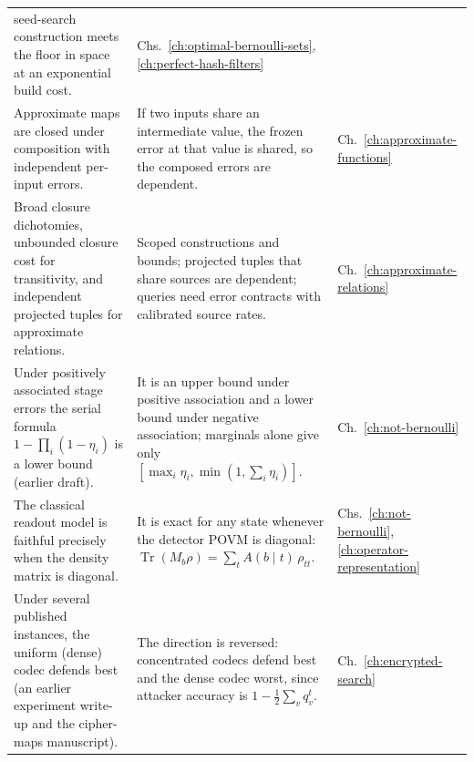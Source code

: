 \begin{longtable}{@{}>{\raggedright\arraybackslash}p{}
                   >{\raggedright\arraybackslash}p{}
                   >{\raggedright\arraybackslash}p{}@{}}
    seed-search construction meets the floor in space at an exponential build
    cost.
  & Chs.~\ref{ch:optimal-bernoulli-sets}, \ref{ch:perfect-hash-filters} \\
Approximate maps are closed under composition with independent per-input
  errors.
  & If two inputs share an intermediate value, the frozen error at that value
    is shared, so the composed errors are dependent.
  & Ch.~\ref{ch:approximate-functions} \\
Broad closure dichotomies, unbounded closure cost for transitivity, and
  independent projected tuples for approximate relations.
  & Scoped constructions and bounds; projected tuples that share sources are
    dependent; queries need error contracts with calibrated source rates.
  & Ch.~\ref{ch:approximate-relations} \\
Under positively associated stage errors the serial formula
  $1 - \prod_i(1 - \eta_i)$ is a lower bound (earlier draft).
  & It is an upper bound under positive association and a lower bound under
    negative association; marginals alone give only
    $[\max_i \eta_i, \min(1, \sum_i \eta_i)]$.
  & Ch.~\ref{ch:not-bernoulli} \\
The classical readout model is faithful precisely when the density matrix is
  diagonal.
  & It is exact for any state whenever the detector POVM is diagonal:
    $\operatorname{Tr}(M_b \rho) = \sum_t A(b \mid t)\,\rho_{tt}$.
  & Chs.~\ref{ch:not-bernoulli}, \ref{ch:operator-representation} \\
Under several published instances, the uniform (dense) codec defends best
  (an earlier experiment write-up and the cipher-maps manuscript).
  & The direction is reversed: concentrated codecs defend best and the dense
    codec worst, since attacker accuracy is $1 - \tfrac{1}{2}\sum_v q_v^t$.
  & Ch.~\ref{ch:encrypted-search} \\
\end{longtable}
\endgroup
